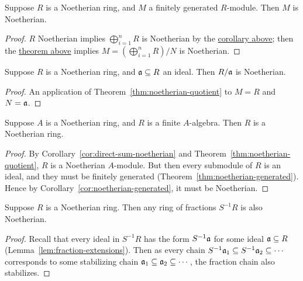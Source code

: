 \begin{corollary}
    Suppose \(R\) is a Noetherian ring,
    and \(M\) a finitely generated \(R\)-module.
    Then \(M\) is Noetherian.
\end{corollary}
\begin{proof}
    \(R\) Noetherian implies \(\bigoplus_{i=1}^n R\) is Noetherian
    by the \hyperref[cor:direct-sum-noetherian]{corollary above};
    then the \hyperref[thm:noetherian-quotient]{theorem above}
    implies \(M = (\bigoplus_{i=1}^n R)/N\) is Noetherian.
\end{proof}
\begin{corollary}
    Suppose \(R\) is a Noetherian ring,
    and \(\mathfrak{a} \subseteq R\) an ideal.
    Then \(R/\mathfrak{a}\) is Noetherian.
\end{corollary}
\begin{proof}
    An application of Theorem~\ref{thm:noetherian-quotient} to \(M = R\) and \(N = \mathfrak{a}\).
\end{proof}

\begin{theorem}\label{thm:finite-algebra-noetherian}
    Suppose \(A\) is a Noetherian ring, and \(R\) is a finite \(A\)-algebra.
    Then \(R\) is a Noetherian ring.
\end{theorem}
\begin{proof}
    By Corollary~\ref{cor:direct-sum-noetherian} and Theorem~\ref{thm:noetherian-quotient},
    \(R\) is a Noetherian \(A\)-module.
    But then every submodule of \(R\) is an ideal,
    and they must be finitely generated (Theorem~\ref{thm:noetherian-generated}).
    Hence by Corollary~\ref{cor:noetherian-generated}, it must be Noetherian.
\end{proof}
\begin{theorem}
    Suppose \(R\) is a Noetherian ring.
    Then any ring of fractions \(S^{-1}R\) is also Noetherian.
\end{theorem}
\begin{proof}
    Recall that every ideal in \(S^{-1}R\) has the form \(S^{-1}\mathfrak{a}\) for some ideal \(\mathfrak{a} \subseteq R\)
    (Lemma~\ref{lem:fraction-extensions}).
    Then as every chain \(S^{-1}\mathfrak{a}_1 \subseteq S^{-1}\mathfrak{a}_2 \subseteq \cdots\)
    corresponds to some stabilizing chain \(\mathfrak{a}_1 \subseteq \mathfrak{a}_2 \subseteq \cdots\),
    the fraction chain also stabilizes.
\end{proof}

